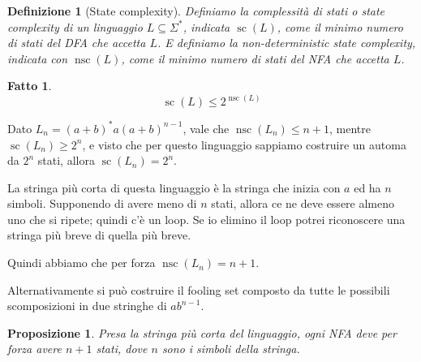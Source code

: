 \documentclass[12pt]{report}
\newtheorem{proposizione}{Proposizione}
\newtheorem{fatto}{Fatto}
\newtheorem{definizione}{Definizione}
\begin{document}
\begin{definizione}[State complexity]
	Definiamo la complessità di stati o state complexity di un linguaggio $L \subseteq \Sigma^*$, indicata $\operatorname{sc}(L)$, come il minimo numero di stati del DFA che accetta $L$.
	E definiamo la non-deterministic state complexity, indicata con $\operatorname{nsc}(L)$, come il minimo numero di stati del NFA che accetta $L$.
\end{definizione}
\begin{fatto}
	$$\operatorname{sc}(L) \leq 2^{\operatorname{nsc}(L)}$$
\end{fatto}
\begin{tcolorbox}
	Dato $L_n = (a + b)^* a (a + b)^{n - 1}$, vale che $\operatorname{nsc}(L_n) \leq n + 1$, mentre $\operatorname{sc}(L_n) \geq 2^n$, e visto che per questo linguaggio sappiamo costruire un automa da $2^n$ stati, allora
	$\operatorname{sc}(L_n) = 2^n$.

	La stringa più corta di questa linguaggio è la stringa che inizia con $a$ ed ha $n$ simboli.
	Supponendo di avere meno di $n$ stati, allora ce ne deve essere almeno uno che si ripete; quindi c'è un loop.
	Se io elimino il loop potrei riconoscere una stringa più breve di quella più breve.

	Quindi abbiamo che per forza $\operatorname{nsc}(L_n) = n + 1$.

	Alternativamente si può costruire il fooling set composto da tutte le possibili scomposizioni in due stringhe di $ab^{n - 1}$.
\end{tcolorbox}
\begin{proposizione}
	Presa la stringa più corta del linguaggio, ogni NFA deve per forza avere $n + 1$ stati, dove $n$ sono i simboli della stringa.
\end{proposizione}
\end{document}
